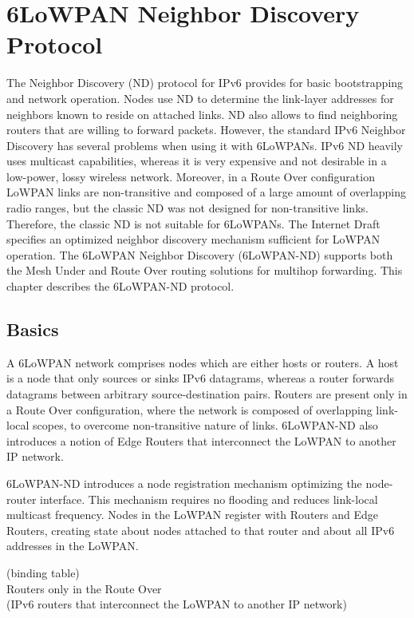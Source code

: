 \chapter{6LoWPAN Neighbor Discovery Protocol}\label{ch:nd}
The Neighbor Discovery (ND) protocol for IPv6 \cite{rfc4861} provides for basic bootstrapping and network operation. Nodes use ND to determine the link-layer addresses for neighbors known to reside on attached links. ND also allows to find neighboring routers that are willing to forward packets. However, the standard IPv6 Neighbor Discovery has several problems when using it with 6LoWPANs. IPv6 ND heavily uses multicast capabilities, whereas it is very expensive and not desirable in a low-power, lossy wireless network. Moreover, in a Route Over configuration LoWPAN links are non-transitive and composed of a large amount of overlapping radio ranges, but the classic ND was not designed for non-transitive links. Therefore, the classic ND is not suitable for 6LoWPANs. The Internet Draft \cite{draft-nd-07} specifies an optimized neighbor discovery mechanism sufficient for LoWPAN operation. The 6LoWPAN Neighbor Discovery (6LoWPAN-ND) supports both the Mesh Under and Route Over routing solutions for multihop forwarding. This chapter describes the 6LoWPAN-ND protocol.

\section{Basics}\label{nd.basic}
A 6LoWPAN network comprises nodes which are either hosts or routers. A host is a node that only sources or sinks IPv6 datagrams, whereas a router forwards datagrams between arbitrary source-destination pairs. Routers are present only in a Route Over configuration, where the network is composed of overlapping link-local scopes, to overcome non-transitive nature of links. 6LoWPAN-ND also introduces a notion of Edge Routers that interconnect the LoWPAN to another IP network. 


6LoWPAN-ND introduces a node registration mechanism optimizing the node-router interface.  This mechanism requires no flooding and reduces link-local multicast frequency. Nodes in the LoWPAN register with Routers and Edge Routers, creating state about nodes attached to that router and about all IPv6 addresses in the LoWPAN. 

(binding table) \\
Routers only in the Route Over\\
(IPv6 routers that interconnect the LoWPAN to another IP network)\\

